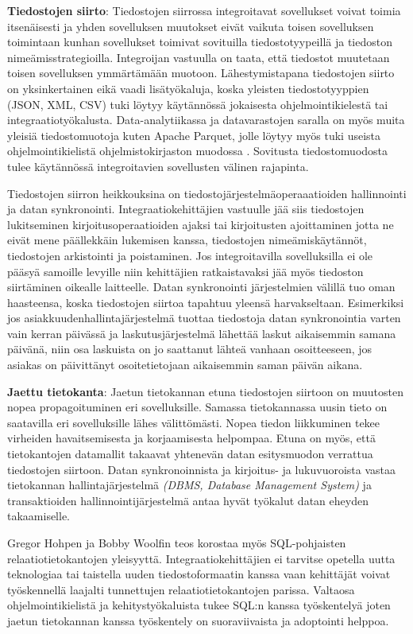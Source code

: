 \textbf{Tiedostojen siirto}: Tiedostojen siirrossa integroitavat sovellukset voivat toimia itsenäisesti ja yhden sovelluksen muutokset eivät vaikuta toisen sovelluksen toimintaan kunhan sovellukset toimivat sovituilla tiedostotyypeillä ja tiedoston nimeämisstrategioilla. Integroijan vastuulla on taata, että tiedostot muutetaan toisen sovelluksen ymmärtämään muotoon. Lähestymistapana tiedostojen siirto on yksinkertainen eikä vaadi lisätyökaluja, koska yleisten tiedostotyyppien (JSON, XML, CSV) tuki löytyy käytännössä jokaisesta ohjelmointikielestä tai integraatiotyökalusta.
Data-analytiikassa ja datavarastojen saralla on myös muita yleisiä tiedostomuotoja kuten Apache Parquet, jolle löytyy myös tuki useista ohjelmointikielistä ohjelmistokirjaston muodossa \citep{Parquet}.
Sovitusta tiedostomuodosta tulee käytännössä integroitavien sovellusten välinen rajapinta.

Tiedostojen siirron heikkouksina on tiedostojärjestelmäoperaaatioiden hallinnointi ja datan synkronointi.
Integraatiokehittäjien vastuulle jää siis tiedostojen lukitseminen kirjoitusoperaatioiden ajaksi tai kirjoitusten ajoittaminen jotta ne eivät mene päällekkäin lukemisen kanssa, tiedostojen nimeämiskäytännöt, tiedostojen arkistointi ja poistaminen. Jos integroitavilla sovelluksilla ei ole pääsyä samoille levyille niin kehittäjien ratkaistavaksi jää myös tiedoston siirtäminen oikealle laitteelle.
Datan synkronointi järjestelmien välillä tuo oman haasteensa, koska tiedostojen siirtoa tapahtuu yleensä harvakseltaan. Esimerkiksi jos asiakkuudenhallintajärjestelmä tuottaa tiedostoja datan synkronointia varten vain kerran päivässä ja laskutusjärjestelmä lähettää laskut aikaisemmin samana päivänä, niin osa laskuista on jo saattanut lähteä vanhaan osoitteeseen, jos asiakas on päivittänyt osoitetietojaan aikaisemmin saman päivän aikana.


\textbf{Jaettu tietokanta}: Jaetun tietokannan etuna tiedostojen siirtoon on muutosten nopea propagoituminen eri sovelluksille. Samassa tietokannassa uusin tieto on saatavilla eri sovelluksille lähes välittömästi. Nopea tiedon liikkuminen tekee virheiden havaitsemisesta ja korjaamisesta helpompaa. Etuna on myös, että tietokantojen datamallit takaavat yhtenevän datan esitysmuodon verrattua tiedostojen siirtoon.
Datan synkronoinnista ja kirjoitus- ja lukuvuoroista vastaa tietokannan hallintajärjestelmä \textit{(DBMS, Database Management System)} ja transaktioiden hallinnointijärjestelmä antaa hyvät työkalut datan eheyden takaamiselle.

Gregor Hohpen ja Bobby Woolfin teos \citep[sivu~69]{Hohpe2004} korostaa myös SQL-pohjaisten relaatiotietokantojen yleisyyttä. Integraatiokehittäjien ei tarvitse opetella uutta teknologiaa tai taistella uuden tiedostoformaatin kanssa vaan kehittäjät voivat työskennellä laajalti tunnettujen relaatiotietokantojen parissa. Valtaosa ohjelmointikielistä ja kehitystyökaluista tukee SQL:n kanssa työskentelyä joten jaetun tietokannan kanssa työskentely on suoraviivaista ja adoptointi helppoa.

